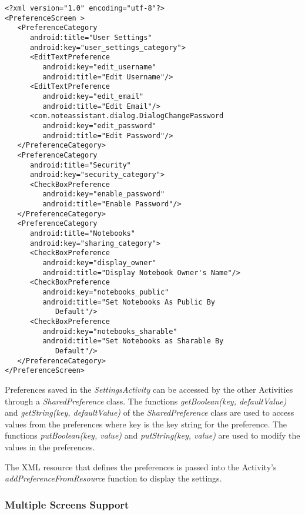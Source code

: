 \begin{lstlisting}[frame=single, label=lst:preferencesxml, caption=Codes in preferences.xml]
<?xml version="1.0" encoding="utf-8"?>
<PreferenceScreen >
   <PreferenceCategory 
      android:title="User Settings"
      android:key="user_settings_category">
      <EditTextPreference
         android:key="edit_username"
         android:title="Edit Username"/>
      <EditTextPreference
         android:key="edit_email"
         android:title="Edit Email"/>
      <com.noteassistant.dialog.DialogChangePassword
         android:key="edit_password"
         android:title="Edit Password"/>
   </PreferenceCategory>
   <PreferenceCategory 
      android:title="Security"
      android:key="security_category">
      <CheckBoxPreference 
         android:key="enable_password"
         android:title="Enable Password"/>
   </PreferenceCategory>
   <PreferenceCategory 
      android:title="Notebooks"
      android:key="sharing_category">
	  <CheckBoxPreference 
         android:key="display_owner"
         android:title="Display Notebook Owner's Name"/> 
      <CheckBoxPreference 
         android:key="notebooks_public"
         android:title="Set Notebooks As Public By
            Default"/>
      <CheckBoxPreference 
         android:key="notebooks_sharable"
         android:title="Set Notebooks as Sharable By
            Default"/>
   </PreferenceCategory>
</PreferenceScreen>
\end{lstlisting}

Preferences saved in the \textit{SettingsActivity} can be accessed by the other Activities through a \textit{SharedPreference} class. The functions \textit{getBoolean(key, defaultValue)} and \textit{getString(key, defaultValue)} of the \textit{SharedPreference} class are used to access values from the preferences where key is the key string for the preference.  The functions \textit{putBoolean(key, value)} and \textit{putString(key, value)} are used to modify the values in the preferences.

The XML resource that defines the preferences is passed into the Activity's \textit{addPreferenceFromResource} function to display the settings.

\subsubsection{Multiple Screens Support}
\label{sec:multiplescreenssupport}


